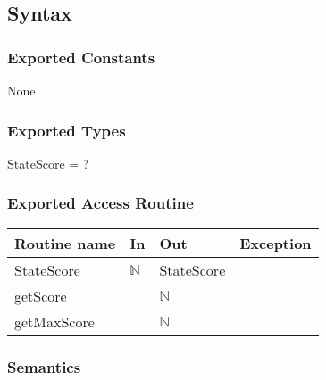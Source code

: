 \documentclass[11pt]{article}
\begin{document}
\subsection*{Syntax}
\label{sec:orgba17dfc}
\subsubsection*{Exported Constants}
\label{sec:org1127bd8}
None

\subsubsection*{Exported Types}
\label{sec:org59e7f93}
StateScore = ?

\subsubsection*{Exported Access Routine}
\label{sec:org6a94d15}
\begin{center}
\begin{tabular}{l|l|l|l}
Routine name & In & Out & Exception\\
\hline
StateScore & \(\mathbb{N}\) & StateScore & \\
getScore &  & \(\mathbb{N}\) & \\
getMaxScore &  & \(\mathbb{N}\) & \\
\end{tabular}
\end{center}

\subsubsection*{Semantics}
\label{sec:orgeb1ccbd}
\end{document}
